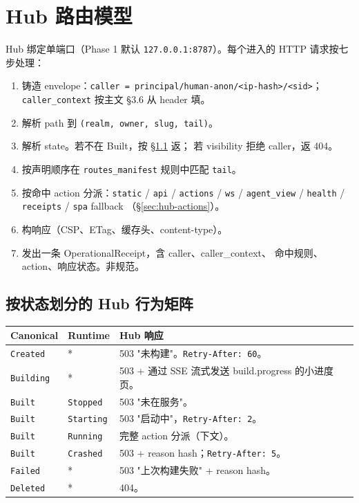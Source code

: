 \documentclass[11pt,a4paper]{article}
\theoremstyle{definition}
\begin{document}
\section{Hub 路由模型}
\label{sec:hub-routing}

Hub 绑定单端口（Phase 1 默认 \texttt{127.0.0.1:8787}）。每个进入的
HTTP 请求按七步处理：

\begin{enumerate}[leftmargin=2.2em,itemsep=0.16em]
    \item 铸造 envelope：\texttt{caller =
    principal/human-anon/<ip-hash>/<sid>}；\texttt{caller\_context}
    按主文 \S3.6 从 header 填。
    \item 解析 path 到 \texttt{(realm, owner, slug, tail)}。
    \item 解析 state。若不在 Built，按 \S\ref{sec:hub-by-state} 返；
    若 visibility 拒绝 caller，返 404。
    \item 按声明顺序在 \texttt{routes\_manifest} 规则中匹配
    \texttt{tail}。
    \item 按命中 action 分派：\texttt{static} / \texttt{api} /
    \texttt{actions} / \texttt{ws} / \texttt{agent\_view} /
    \texttt{health} / \texttt{receipts} / \texttt{spa} fallback
    （\S\ref{sec:hub-actions}）。
    \item 构响应（CSP、ETag、缓存头、content-type）。
    \item 发出一条 OperationalReceipt，含 caller、caller\_context、
    命中规则、action、响应状态。非规范。
\end{enumerate}

\subsection{按状态划分的 Hub 行为矩阵}
\label{sec:hub-by-state}

\begin{center}
\renewcommand{\arraystretch}{1.25}
\begin{tabularx}{\linewidth}{l l X}
\toprule
\textbf{Canonical} & \textbf{Runtime} & \textbf{Hub 响应} \\
\midrule
\texttt{Created}  & *           & 503 "未构建"。\texttt{Retry-After: 60}。 \\
\texttt{Building} & *           & 503 + 通过 SSE 流式发送 build.progress 的小进度页。 \\
\texttt{Built}    & \texttt{Stopped}  & 503 "未在服务"。 \\
\texttt{Built}    & \texttt{Starting} & 503 "启动中"，\texttt{Retry-After: 2}。 \\
\texttt{Built}    & \texttt{Running}  & 完整 action 分派（下文）。 \\
\texttt{Built}    & \texttt{Crashed}  & 503 + reason hash；\texttt{Retry-After: 5}。 \\
\texttt{Failed}   & *           & 503 "上次构建失败" + reason hash。 \\
\texttt{Deleted}  & *           & 404。 \\
\bottomrule
\end{tabularx}
\end{center}
\end{document}
